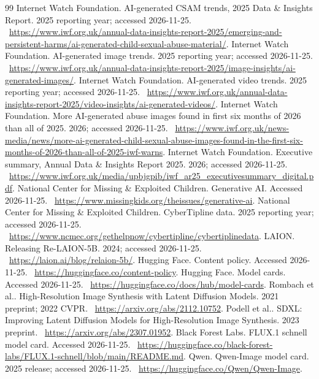 \documentclass[11pt,a4paper]{article}
\begin{document}
\clearpage\begin{thebibliography}{99}\small
{} Internet Watch Foundation. AI-generated CSAM trends, 2025 Data \& Insights Report. 2025 reporting year; accessed 2026-11-25. \ \url{https://www.iwf.org.uk/annual-data-insights-report-2025/emerging-and-persistent-harms/ai-generated-child-sexual-abuse-material/}.
 Internet Watch Foundation. AI-generated image trends. 2025 reporting year; accessed 2026-11-25. \ \url{https://www.iwf.org.uk/annual-data-insights-report-2025/image-insights/ai-generated-images/}.
 Internet Watch Foundation. AI-generated video trends. 2025 reporting year; accessed 2026-11-25. \ \url{https://www.iwf.org.uk/annual-data-insights-report-2025/video-insights/ai-generated-videos/}.
 Internet Watch Foundation. More AI-generated abuse images found in first six months of 2026 than all of 2025. 2026; accessed 2026-11-25. \ \url{https://www.iwf.org.uk/news-media/news/more-ai-generated-child-sexual-abuse-images-found-in-the-first-six-months-of-2026-than-all-of-2025-iwf-warns}.
 Internet Watch Foundation. Executive summary, Annual Data \& Insights Report 2025. 2026; accessed 2026-11-25. \ \url{https://www.iwf.org.uk/media/upbjgpib/iwf_ar25_executivesummary_digital.pdf}.
 National Center for Missing \& Exploited Children. Generative AI. Accessed 2026-11-25. \ \url{https://www.missingkids.org/theissues/generative-ai}.
 National Center for Missing \& Exploited Children. CyberTipline data. 2025 reporting year; accessed 2026-11-25. \ \url{https://www.ncmec.org/gethelpnow/cybertipline/cybertiplinedata}.
 LAION. Releasing Re-LAION-5B. 2024; accessed 2026-11-25. \ \url{https://laion.ai/blog/relaion-5b/}.
 Hugging Face. Content policy. Accessed 2026-11-25. \ \url{https://huggingface.co/content-policy}.
 Hugging Face. Model cards. Accessed 2026-11-25. \ \url{https://huggingface.co/docs/hub/model-cards}.
 Rombach et al.. High-Resolution Image Synthesis with Latent Diffusion Models. 2021 preprint; 2022 CVPR. \ \url{https://arxiv.org/abs/2112.10752}.
 Podell et al.. SDXL: Improving Latent Diffusion Models for High-Resolution Image Synthesis. 2023 preprint. \ \url{https://arxiv.org/abs/2307.01952}.
 Black Forest Labs. FLUX.1 schnell model card. Accessed 2026-11-25. \ \url{https://huggingface.co/black-forest-labs/FLUX.1-schnell/blob/main/README.md}.
 Qwen. Qwen-Image model card. 2025 release; accessed 2026-11-25. \ \url{https://huggingface.co/Qwen/Qwen-Image}.

\end{thebibliography}
\end{document}
